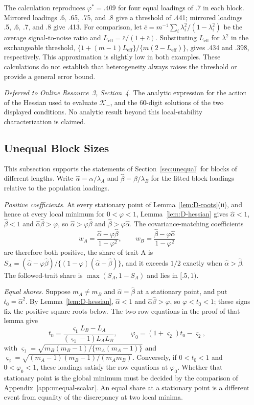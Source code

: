The calculation reproduces $\varphi^*=.409$ for four equal loadings of .7 in each block. Mirrored loadings .6, .65, .75, and .8 give a threshold of .441; mirrored loadings .5, .6, .7, and .8 give .413. For comparison, let $\bar c=m^{-1}\sum_i\lambda_i^2/(1-\lambda_i^2)$ be the average signal-to-noise ratio and $L_{\mathrm{eff}}=\bar c/(1+\bar c)$. Substituting $L_{\mathrm{eff}}$ for $\lambda^2$ in the exchangeable threshold, $\{1+(m-1)L_{\mathrm{eff}}\}/\{m(2-L_{\mathrm{eff}})\}$, gives .434 and .398, respectively. This approximation is slightly low in both examples. These calculations do not establish that heterogeneity always raises the threshold or provide a general error bound.

\textit{Deferred to Online Resource~3, Section~4.} The analytic expression for the action of the Hessian used to evaluate $\mathcal K_-$, and the 60-digit solutions of the two displayed conditions. No analytic result beyond this local-stability characterization is claimed.

\subsection{Unequal Block Sizes}
\label{app:unequal-sizes}

This subsection supports the statements of Section~\ref{sec:unequal} for blocks of different lengths. Write $\hat\alpha=\alpha/\lambda_A$ and $\hat\beta=\beta/\lambda_B$ for the fitted block loadings relative to the population loadings.

\textit{Positive coefficients.} At every stationary point of Lemma~\ref{lem:D-roots}(ii), and hence at every local minimum for $0<\varphi<1$, Lemma~\ref{lem:D-hessian} gives $\hat\alpha<1$, $\hat\beta<1$ and $\hat\alpha\hat\beta>\varphi$, so $\hat\alpha>\varphi\hat\beta$ and $\hat\beta>\varphi\hat\alpha$. The covariance-matching coefficients
\[
w_A=\frac{\hat\alpha-\varphi\hat\beta}{1-\varphi^2},\qquad
w_B=\frac{\hat\beta-\varphi\hat\alpha}{1-\varphi^2}
\]
are therefore both positive, the share of trait A is $S_A=(\hat\alpha-\varphi\hat\beta)/\{(1-\varphi)(\hat\alpha+\hat\beta)\}$, and it exceeds $1/2$ exactly when $\hat\alpha>\hat\beta$. The followed-trait share is $\max(S_A,1-S_A)$ and lies in $[.5,1)$.

\textit{Equal shares.} Suppose $m_A\ne m_B$ and $\hat\alpha=\hat\beta$ at a stationary point, and put $t_0=\hat\alpha^2$. By Lemma~\ref{lem:D-hessian}, $\hat\alpha<1$ and $\hat\alpha\hat\beta>\varphi$, so $\varphi<t_0<1$; these signs fix the positive square roots below. The two row equations in the proof of that lemma give
\[
t_0=\frac{\varsigma_1L_B-L_A}{(\varsigma_1-1)L_AL_B},\qquad
\varphi_0=(1+\varsigma_2)t_0-\varsigma_2,
\]
with $\varsigma_1=\sqrt{m_B(m_B-1)/\{m_A(m_A-1)\}}$ and $\varsigma_2=\sqrt{(m_A-1)(m_B-1)/(m_Am_B)}$. Conversely, if $0<t_0<1$ and $0<\varphi_0<1$, these loadings satisfy the row equations at $\varphi_0$. Whether that stationary point is the global minimum must be decided by the comparison of Appendix~\ref{app:unequal-scalar}. An equal share at a stationary point is a different event from equality of the discrepancy at two local minima.

